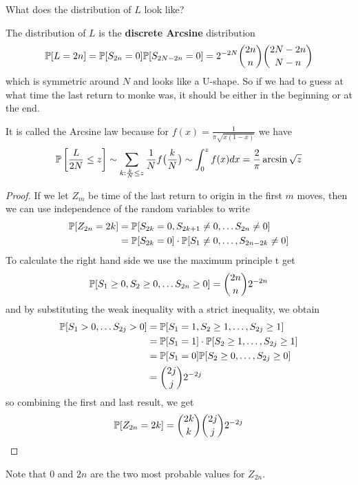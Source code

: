 What does the distribution of $L$ look like? 
\begin{thm}
The distribution of $L$ is the \textbf{discrete Arcsine} distribution
\begin{align*}
  \mathbb{P}[L = 2n] = \mathbb{P}[S_{2n} = 0]\mathbb{P}[S_{2N - 2n} = 0] = 2^{-2N} \binom{2n}{n} \binom{2N - 2n}{N-n}
\end{align*}
which is symmetric around $N$ and looks like a U-shape.
So if we had to guess at what time the last return to monke was, it should be either in the beginning or at the end.

It is called the Arcsine law because for $f(x) = \frac{1}{\pi \sqrt{x(1-x)}}$ we have
\begin{align*}
  \mathbb{P}\left[\frac{L}{2N}\leq z\right] \sim \sum_{k: \frac{k}{N}\leq z} \frac{1}{N}f\big(\frac{k}{N}\big) \sim \int_{0}^{z}f(x)dx = \frac{2}{\pi} \arcsin \sqrt{z}
\end{align*}
\end{thm}
\begin{proof}
  If we let $Z_{m}$ be time of the last return to origin in the first $m$ moves, then  we can use independence of the random variables to write
\begin{align*}
  \mathbb{P}[Z_{2n} = 2k] 
  &= 
  \mathbb{P}[S_{2k} = 0, S_{2k+1} \neq 0, \ldots S_{2n} \neq 0]\\
  &=
  \mathbb{P}[S_{2k}=0] \cdot \mathbb{P}[S_1 \neq 0, \ldots, S_{2n-2k} \neq 0]
\end{align*}
To calculate the right hand side we use the maximum principle t get
\begin{align*}
  \mathbb{P}[S_1 \geq 0, S_2 \geq 0, \ldots S_{2n} \geq 0] = \binom{2n}{n} 2^{-2n}
\end{align*}
and by substituting the weak inequality with a strict inequality, we obtain
\begin{align*}
  \mathbb{P}[S_1 > 0, \ldots S_{2j} > 0]
  &=
  \mathbb{P}[S_1 = 1, S_2 \geq 1,\ldots, S_{2j} \geq 1]\\
  &=
  \mathbb{P}[S_1 = 1] \cdot \mathbb{P}[S_2 \geq1, \ldots, S_{2j} \geq 1]\\
  &=
  \mathbb{P}[S_1 = 0] \mathbb{P}[S_2 \geq 0, \ldots, S_{2j} \geq 0]\\
  &=
  \binom{2j}{j}2^{-2j}
\end{align*}
so combining the first and last result, we get
\begin{align*}
  \mathbb{P}[Z_{2n} = 2k] = \binom{2k}{k}\binom{2j}{j}2^{-2j}
\end{align*}
\end{proof}
Note that $0$ and $2n$ are the two most probable values for $Z_{2n}$.

